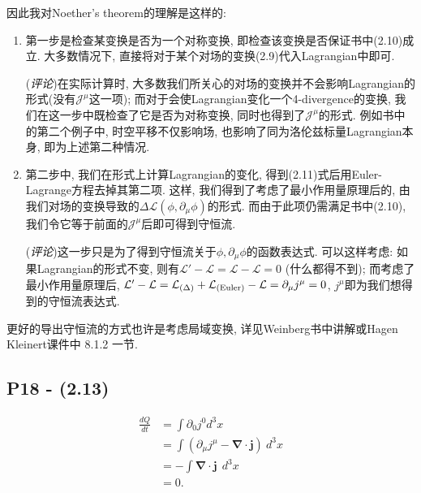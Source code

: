 因此我对Noether's theorem的理解是这样的:
\begin{enumerate}
  \item 第一步是检查某变换是否为一个对称变换, 即检查该变换是否保证书中(2.10)成立.
        大多数情况下, 直接将对于某个对场的变换(2.9)代入Lagrangian中即可.

        (\textit{评论})在实际计算时, 大多数我们所关心的对场的变换并不会影响Lagrangian的形式(没有$\mathcal{J}^{\mu}$这一项); 而对于会使Lagrangian变化一个4-divergence的变换, 我们在这一步中既检查了它是否为对称变换, 同时也得到了$\mathcal{J}^{\mu}$的形式.
        例如书中的第二个例子中, 时空平移不仅影响场, 也影响了同为洛伦兹标量Lagrangian本身, 即为上述第二种情况.
  \item 第二步中, 我们在形式上计算Lagrangian的变化, 得到(2.11)式后用Euler-Lagrange方程去掉其第二项.
        这样, 我们得到了考虑了最小作用量原理后的, 由我们对场的变换导致的$\Delta \mathcal{L}(\phi, \partial_\mu \phi)$的形式.
        而由于此项仍需满足书中(2.10), 我们令它等于前面的$\mathcal{J}^{\mu}$后即可得到守恒流.

        (\textit{评论})这一步只是为了得到守恒流关于$\phi, \partial_\mu \phi$的函数表达式.
        可以这样考虑: 如果Lagrangian的形式不变, 则有$\mathcal{L}'-\mathcal{L}=\mathcal{L}-\mathcal{L}=0$ (什么都得不到); 而考虑了最小作用量原理后, $\mathcal{L}'-\mathcal{L}=\mathcal{L}_{(\Delta)}+\mathcal{L}_{(\rm Euler)}-\mathcal{L}=\partial_{\mu}j^{\mu}=0$, $j^{\mu}$即为我们想得到的守恒流表达式.
\end{enumerate}

\begin{mybox}{}
  更好的导出守恒流的方式也许是考虑局域变换, 详见Weinberg书中讲解或Hagen Kleinert课件中 8.1.2 一节.
\end{mybox}

\subsection{P18 - (2.13)}
\begin{equation}
  \begin{aligned}
    \frac{dQ}{dt} & = \int \partial_0 j^0 d^3 x                                      \\
                  & = \int (\partial_\mu j^\mu - \bm{\nabla}\cdot\mathbf{j}) \ d^3 x \\
                  & = - \int \bm{\nabla}\cdot\mathbf{j}\ \ d^3 x                     \\
                  & =0.
  \end{aligned}
\end{equation}

